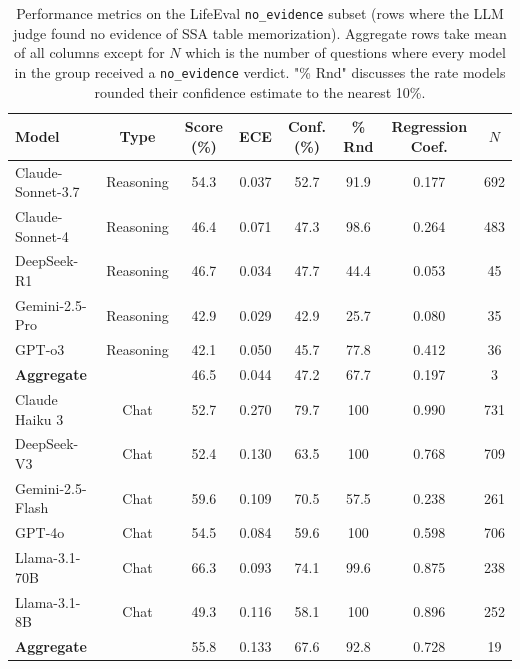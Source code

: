 \documentclass{article}
\begin{document}
\begin{appendices}
\begin{table}[h]
    \centering
    \small
    \begin{tabular}{lccccccc}
    \toprule
    \textbf{Model} & \textbf{Type} & \textbf{Score (\%)} & \textbf{ECE} & \textbf{Conf. (\%)} & \textbf{\% Rnd} & \textbf{Regression Coef.} & \textbf{$N$} \\
    \midrule
    Claude-Sonnet-3.7    & Reasoning & 54.3 & 0.037 & 52.7 & 91.9  & 0.177 & 692 \\
    Claude-Sonnet-4      & Reasoning & 46.4 & 0.071 & 47.3 & 98.6  & 0.264 & 483 \\
    DeepSeek-R1          & Reasoning & 46.7 & 0.034 & 47.7 & 44.4  & 0.053 & 45 \\
    Gemini-2.5-Pro       & Reasoning & 42.9 & 0.029 & 42.9 & 25.7  & 0.080 & 35 \\
    GPT-o3               & Reasoning & 42.1 & 0.050 & 45.7 & 77.8  & 0.412 & 36 \\
    \midrule
    {\textbf{Aggregate}}  &           & 46.5 & 0.044 & 47.2 & 67.7  & 0.197 & 3 \\
    \midrule
    Claude Haiku 3       & Chat & 52.7 & 0.270 & 79.7 & 100  & 0.990 & 731 \\
    DeepSeek-V3          & Chat & 52.4 & 0.130 & 63.5 & 100  & 0.768 & 709 \\
    Gemini-2.5-Flash     & Chat & 59.6 & 0.109 & 70.5 & 57.5  & 0.238 & 261 \\
    GPT-4o               & Chat & 54.5 & 0.084 & 59.6 & 100  & 0.598 & 706 \\
    Llama-3.1-70B        & Chat & 66.3 & 0.093 & 74.1 & 99.6  & 0.875 & 238 \\
    Llama-3.1-8B         & Chat & 49.3 & 0.116 & 58.1 & 100  & 0.896 & 252 \\
    \midrule
    {\textbf{Aggregate}}  &           & 55.8 & 0.133 & 67.6 & 92.8  & 0.728 & 19 \\
    \bottomrule
    \end{tabular}
    \caption{Performance metrics on the LifeEval \texttt{no\_evidence} subset (rows where the LLM judge found no evidence of SSA table memorization). Aggregate rows take mean of all columns except for $N$ which is the number of questions where every model in the group received a \texttt{no\_evidence} verdict. "\% Rnd" discusses the rate models rounded their confidence estimate to the nearest 10\%.}
    \label{le_info_subset}
\end{table}


\newpage


\end{appendices}
\end{document}
